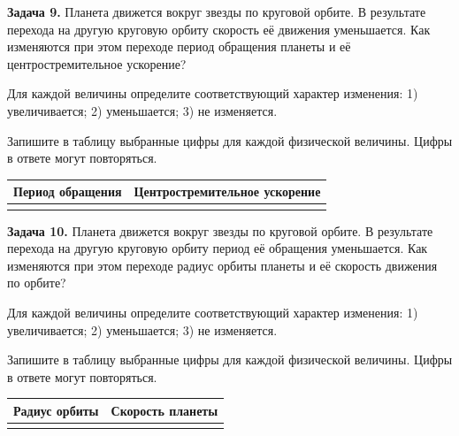 \begin{taskbasic}[code={\label{task:gravity_v9_n6}}]
\textbf{Задача 9.} Планета движется вокруг звезды по круговой орбите. В результате перехода на другую круговую орбиту скорость её движения уменьшается. Как изменяются при этом переходе период обращения планеты и её центростремительное ускорение?

Для каждой величины определите соответствующий характер изменения:
1) увеличивается;
2) уменьшается;
3) не изменяется.

Запишите в таблицу выбранные цифры для каждой физической величины. Цифры в ответе могут повторяться.
\begin{center}
\begin{tabular}{|c|c|}
\hline
Период обращения & Центростремительное ускорение \\ \hline
 & \\ \hline
\end{tabular}
\end{center}

\end{taskbasic}

\begin{taskbasic}[code={\label{task:gravity_v10_n6}}]
\textbf{Задача 10.} Планета движется вокруг звезды по круговой орбите. В результате перехода на другую круговую орбиту период её обращения уменьшается. Как изменяются при этом переходе радиус орбиты планеты и её скорость движения по орбите?

Для каждой величины определите соответствующий характер изменения:
1) увеличивается;
2) уменьшается;
3) не изменяется.

Запишите в таблицу выбранные цифры для каждой физической величины. Цифры в ответе могут повторяться.
\begin{center}
\begin{tabular}{|c|c|}
\hline
Радиус орбиты & Скорость планеты \\ \hline
 & \\ \hline
\end{tabular}
\end{center}

\end{taskbasic}


